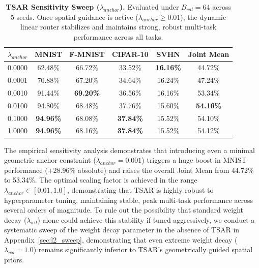 \begin{table}[t]
\caption{\textbf{TSAR Sensitivity Sweep ($\lambda_{anchor}$).} Evaluated under $B_{cal}=64$ across 5 seeds. Once spatial guidance is active ($\lambda_{anchor} \ge 0.01$), the dynamic linear router stabilizes and maintains strong, robust multi-task performance across all tasks.}
\label{tab:sensitivity}
\vskip 0.15in
\begin{center}
\begin{small}
\begin{sc}
\setlength{\tabcolsep}{8pt}
\begin{tabular}{lccccc}
\toprule
$\lambda_{anchor}$ & MNIST & F-MNIST & CIFAR-10 & SVHN & Joint Mean \\
\midrule
0.0000 & 62.48\% & 66.72\% & 33.52\% & \textbf{16.16\%} & 44.72\% \\
0.0001 & 70.88\% & 67.20\% & 34.64\% & 16.24\% & 47.24\% \\
0.0010 & 91.44\% & \textbf{69.20\%} & 36.56\% & 16.16\% & 53.34\% \\
0.0100 & 94.80\% & 68.48\% & 37.76\% & 15.60\% & \textbf{54.16\%} \\
0.1000 & \textbf{94.96\%} & 68.08\% & \textbf{37.84\%} & 15.52\% & 54.10\% \\
1.0000 & \textbf{94.96\%} & 68.16\% & \textbf{37.84\%} & 15.52\% & 54.12\% \\
\bottomrule
\end{tabular}
\end{sc}
\end{small}
\end{center}
\vskip -0.1in
\end{table}

The empirical sensitivity analysis demonstrates that introducing even a minimal geometric anchor
constraint ($\lambda_{anchor}=0.001$) triggers a huge boost in MNIST performance (+28.96\% absolute)
and raises the overall Joint Mean from 44.72\% to 53.34\%. The optimal scaling factor is achieved in
the range $\lambda_{anchor} \in [0.01, 1.0]$, demonstrating that TSAR is highly robust to
hyperparameter tuning, maintaining stable, peak multi-task performance across several orders of
magnitude. To rule out the possibility that standard weight decay ($\lambda_{wd}$) alone could
achieve this stability if tuned aggressively, we conduct a systematic sweep of the weight decay
parameter in the absence of TSAR in Appendix~\ref{sec:l2_sweep}, demonstrating that even extreme
weight decay ($\lambda_{wd}=1.0$) remains significantly inferior to TSAR's geometrically guided
spatial priors.

